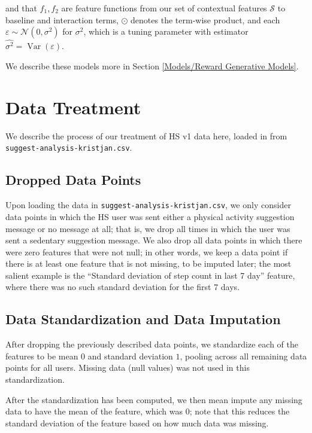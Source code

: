 and that $f_1, f_2$ are feature functions from our set of contextual features $\mathcal{S}$ to baseline and interaction terms, $\odot$ denotes the term-wise product, and each $\varepsilon \sim \mathcal{N}\left(0, \sigma^2 \right)$ for $\sigma^2$, which is a tuning parameter with estimator $\hat{\sigma^2} = \operatorname{Var}(\varepsilon)$.  

We describe these models more in Section \ref{Models/Reward Generative Models}.

\section{Data Treatment}

We describe the process of our treatment of HS v1 data here, loaded in from \verb+suggest-analysis-kristjan.csv+.

	\subsection{Dropped Data Points}

	Upon loading the data in \verb+suggest-analysis-kristjan.csv+, we only consider data points in which the HS user was sent either a physical activity suggestion message or no message at all; that is, we drop all times in which the user was sent a sedentary suggestion message.  We also drop all data points in which there were zero features that were not null; in other words, we keep a data point if there is at least one feature that is not missing, to be imputed later; the most salient example is the ``Standard deviation of step count in last 7 day'' feature, where there was no such standard deviation for the first $7$ days.

	\subsection{Data Standardization and Data Imputation}

	After dropping the previously described data points, we standardize each of the features to be mean $0$ and standard deviation $1$, pooling across all remaining data points for all users.  Missing data (null values) was not used in this standardization.

	After the standardization has been computed, we then mean impute any missing data to have the mean of the feature, which was $0$; note that this reduces the standard deviation of the feature based on how much data was missing.

